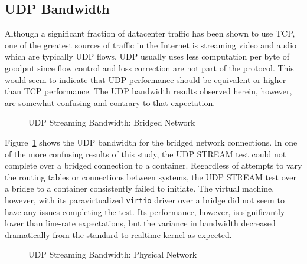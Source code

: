 \subsection{UDP Bandwidth} %
\label{sub:udpbandwidth}
Although a significant fraction of datacenter traffic has been shown to use TCP, one of the greatest sources of traffic in the Internet is streaming video and audio which are typically UDP flows.
UDP usually uses less computation per byte of goodput since flow control and loss correction are not part of the protocol.  
This would seem to indicate that UDP performance should be equivalent or higher than TCP performance.  
The UDP bandwidth results observed herein, however, are somewhat confusing and contrary to that expectation.

\begin{figure}
    \centering
    \def\svgwidth{\columnwidth}
    
    \caption{UDP Streaming Bandwidth: Bridged Network}
    \label{fig:udp_stream_bridge}
\end{figure}
Figure~\ref{fig:udp_stream_bridge} shows the UDP bandwidth for the bridged network connections.  
In one of the more confusing results of this study, the UDP STREAM test could not complete over a bridged connection to a container.
Regardless of attempts to vary the routing tables or connections between systems, the UDP STREAM test over a bridge to a container consistently failed to initiate.
The virtual machine, however, with its paravirtualized \texttt{virtio} driver over a bridge did not seem to have any issues completing the test.  
Its performance, however, is significantly lower than line-rate expectations, but the variance in bandwidth decreased dramatically from the standard to realtime kernel as expected.  

\begin{figure}
    \centering
    \def\svgwidth{\columnwidth}
    
    \caption{UDP Streaming Bandwidth: Physical Network}
    \label{fig:udp_stream_phys}
\end{figure}

